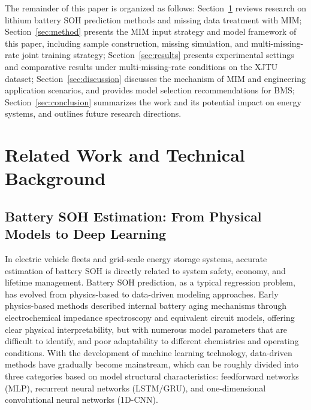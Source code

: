\documentclass[5p,times]{elsarticle}
\begin{document}
The remainder of this paper is organized as follows: Section~\ref{sec:related} reviews research on lithium battery SOH prediction methods and missing data treatment with MIM; Section~\ref{sec:method} presents the MIM input strategy and model framework of this paper, including sample construction, missing simulation, and multi-missing-rate joint training strategy; Section~\ref{sec:results} presents experimental settings and comparative results under multi-missing-rate conditions on the XJTU dataset; Section~\ref{sec:discussion} discusses the mechanism of MIM and engineering application scenarios, and provides model selection recommendations for BMS; Section~\ref{sec:conclusion} summarizes the work and its potential impact on energy systems, and outlines future research directions.

\section{Related Work and Technical Background}\label{sec:related}

\subsection{Battery SOH Estimation: From Physical Models to Deep Learning}

In electric vehicle fleets and grid-scale energy storage systems, accurate estimation of battery SOH is directly related to system safety, economy, and lifetime management. Battery SOH prediction, as a typical regression problem, has evolved from physics-based to data-driven modeling approaches. Early physics-based methods described internal battery aging mechanisms through electrochemical impedance spectroscopy and equivalent circuit models\cite{wang2020phys,yang2019ecm}, offering clear physical interpretability, but with numerous model parameters that are difficult to identify, and poor adaptability to different chemistries and operating conditions. With the development of machine learning technology, data-driven methods have gradually become mainstream\cite{liu2025deep,shao2023review,wang2023battery}, which can be roughly divided into three categories based on model structural characteristics: feedforward networks (MLP), recurrent neural networks (LSTM/GRU), and one-dimensional convolutional neural networks (1D-CNN).
\end{document}
